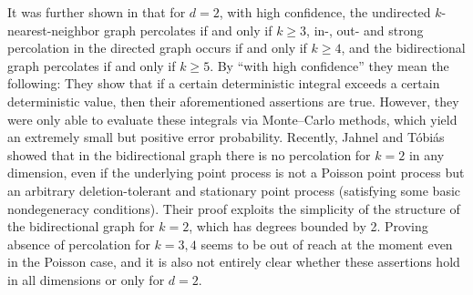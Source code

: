 \documentclass[oneside]{amsart}
\theoremstyle{definition}
\newcommand{\1}{\mathbbm{1}}
\newcommand{\0}{\mathbf{o}}
\numberwithin{equation}{section}
\begin{document}

It was further shown in \cite{BalisterBollobas13} that for $d=2$, with high confidence, the undirected $k$-nearest-neighbor graph percolates if and only if $k \geq 3$, in-, out- and strong percolation in the directed graph occurs if and only if $k\geq 4$, and the bidirectional graph percolates if and only if $k\geq 5$. By ``with high confidence'' they mean the following: They show that if a certain deterministic integral exceeds a certain deterministic value, then their aforementioned assertions are true. However, they were only able to evaluate these integrals via Monte--Carlo methods, which yield an extremely small but positive error probability. Recently, Jahnel and T\'obi\'as \cite{JT22} showed that in the bidirectional graph there is no percolation for $k=2$ in any dimension, even if the underlying point process is not a Poisson point process but an arbitrary deletion-tolerant and stationary point process (satisfying some basic nondegeneracy conditions). Their proof exploits the simplicity of the structure of the bidirectional graph for $k=2$, which has degrees bounded by 2. Proving absence of percolation for $k=3,4$ seems to be out of reach at the moment even in the Poisson case, and it is also not entirely clear whether these assertions hold in all dimensions or only for $d=2$.
\end{document}
